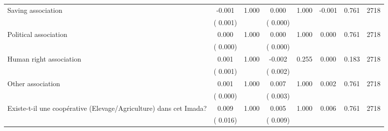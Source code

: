 \begin{tabular}{l*{7}{c}}
 Saving association       &             -0.001       &        1.000  &              0.000       &        1.000  &             -0.001       &              0.761 &  2718 \\ 
                       &       (       0.001)             &                               &       (       0.000)                     &                               &                                               &                                &                      \\ 

 Political association       &              0.000       &        1.000  &              0.000       &        1.000  &              0.000       &              0.761 &  2718 \\ 
                       &       (       0.000)             &                               &       (       0.000)                     &                               &                                               &                                &                      \\ 

 Human right association       &              0.001       &        1.000  &             -0.002       &        0.255  &              0.000       &              0.183 &  2718 \\ 
                       &       (       0.001)             &                               &       (       0.002)                     &                               &                                               &                                &                      \\ 

 Other association       &              0.001       &        1.000  &              0.007       &        1.000  &              0.002       &              0.761 &  2718 \\ 
                       &       (       0.000)             &                               &       (       0.003)                     &                               &                                               &                                &                      \\ 

 Existe-t-il une coopérative (Elevage/Agriculture) dans cet Imada?       &              0.009       &        1.000  &              0.005       &        1.000  &              0.006       &              0.761 &  2718 \\ 
                       &       (       0.016)             &                               &       (       0.009)                     &                               &                                               &                                &                      \\ 


\end{tabular}
